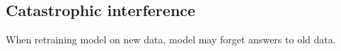 
\subsection{Catastrophic interference}

When retraining model on new data, model may forget answers to old data.